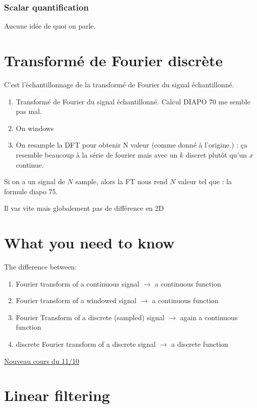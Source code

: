 \documentclass{article}
\theoremstyle{plain}%
\theoremstyle{definition}
\theoremstyle{remark}
\begin{document}
\subsubsection{Scalar quantification}
Aucune idée de quoi on parle.

\section{Transformé de Fourier discrète}
C'est l'échantillonnage de la transformé de Fourier du signal échantillonné.  \begin{enumerate}
    \item Transformé de Fourier du signal échantillonné. Calcul DIAPO 70 me semble pas mal.
    \item On windows
    \item On resample la DFT pour obtenir N valeur (comme donné à l'origine.) : ça resemble beaucoup à la série de fourier mais avec un $ k $ discret plutôt qu'un $ x $ continue. 
\end{enumerate}
Si on a un signal de $ N $ sample, alors la FT nous rend $ N $ valeur tel que : la formule diapo 75. 

Il vas vite mais globalement pas de différence en 2D 

\section{What you need to know}
The difference between:
\begin{enumerate}
    \item Fourier transform of a continuous signal $\rightarrow$ a continuous function
    \item Fourier transform of a windowed signal $\rightarrow$ a continuous function
    \item Fourier Transform of a discrete (sampled) signal $\rightarrow$ again a continuous function
    \item discrete Fourier transform of a discrete signal $\rightarrow$ a discrete function
\end{enumerate}

\underline{Nouveau cours du 11/10} \\

\section{Linear filtering}
\end{document}
